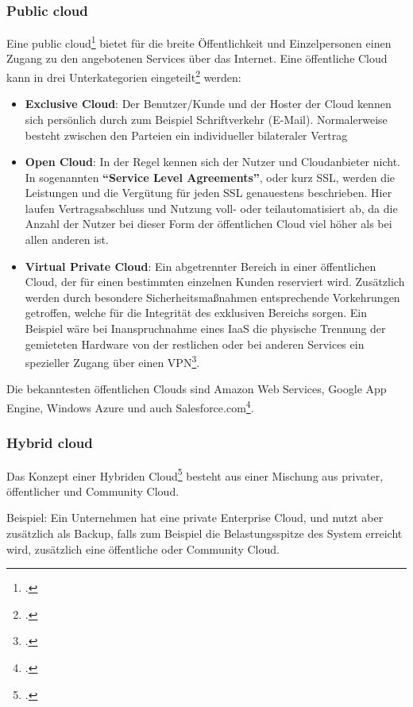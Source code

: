 \subsubsection{Public cloud}
Eine public cloud\footcite{cloud-ms-ph} bietet für die breite Öffentlichkeit und Einzelpersonen einen Zugang zu den angebotenen Services über das Internet.
Eine öffentliche Cloud kann in drei Unterkategorien eingeteilt\footcite{Lehrunterlagen-HTL-cloud} werden:
\begin{itemize}
	\item \textbf{Exclusive Cloud}: Der Benutzer/Kunde und der Hoster der Cloud kennen sich persönlich durch zum Beispiel Schriftverkehr (E-Mail). Normalerweise besteht zwischen den Parteien ein individueller bilateraler Vertrag
	\item \textbf{Open Cloud}: In der Regel kennen sich der Nutzer und Cloudanbieter nicht. In sogenannten \textbf{"`Service Level Agreements"'}, oder kurz SSL, werden die Leistungen und die Vergütung für jeden SSL genauestens beschrieben. Hier laufen Vertragsabschluss und Nutzung voll- oder teilautomatisiert ab, da die Anzahl der Nutzer bei dieser Form der öffentlichen Cloud viel höher als bei allen anderen ist.
	\item \textbf{Virtual Private Cloud}: Ein abgetrennter Bereich in einer öffentlichen Cloud, der für einen bestimmten einzelnen Kunden reserviert wird. Zusätzlich werden durch besondere Sicherheitsmaßnahmen entsprechende Vorkehrungen getroffen, welche für die Integrität des exklusiven Bereichs sorgen. Ein Beispiel wäre bei Inanspruchnahme eines IaaS die physische Trennung der gemieteten Hardware von der restlichen oder bei anderen Services ein spezieller Zugang über einen VPN\footcite{Lehrunterlagen-HTL-cloud}.
\end{itemize}
Die bekanntesten öffentlichen Clouds sind Amazon Web Services, Google App Engine, Windows Azure und auch Salesforce.com\footcite{cloud-computing}.
\subsubsection{Hybrid cloud}
Das Konzept einer Hybriden Cloud\footcite{cloud-ms-ph} besteht aus einer Mischung aus privater, öffentlicher und Community Cloud.

Beispiel: Ein Unternehmen hat eine private Enterprise Cloud, und nutzt aber zusätzlich als Backup, falls zum Beispiel die Belastungsspitze des System erreicht wird, zusätzlich eine öffentliche oder Community Cloud.
